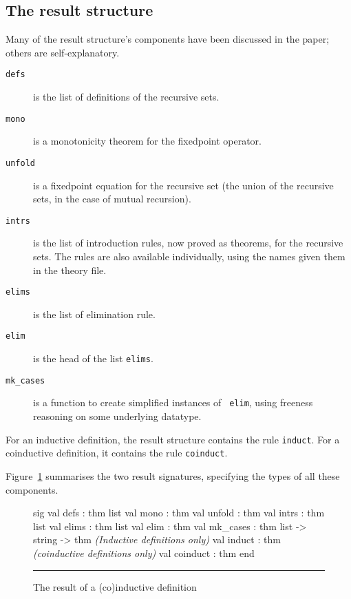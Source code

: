 \subsection{The result structure}
Many of the result structure's components have been discussed in the paper;
others are self-explanatory.
\begin{description}
\item[\tt defs] is the list of definitions of the recursive sets.

\item[\tt mono] is a monotonicity theorem for the fixedpoint operator.

\item[\tt unfold] is a fixedpoint equation for the recursive set (the union of
the recursive sets, in the case of mutual recursion).

\item[\tt intrs] is the list of introduction rules, now proved as theorems, for
the recursive sets.  The rules are also available individually, using the
names given them in the theory file. 

\item[\tt elims] is the list of elimination rule.

\item[\tt elim] is the head of the list {\tt elims}.
  
\item[\tt mk_cases] is a function to create simplified instances of {\tt
elim}, using freeness reasoning on some underlying datatype.
\end{description}

For an inductive definition, the result structure contains the
rule \texttt{induct}.  For a
coinductive definition, it contains the rule \verb|coinduct|.

Figure~\ref{def-result-fig} summarises the two result signatures,
specifying the types of all these components.

\begin{figure}
\begin{ttbox}
sig
val defs         : thm list
val mono         : thm
val unfold       : thm
val intrs        : thm list
val elims        : thm list
val elim         : thm
val mk_cases     : thm list -> string -> thm
{\it(Inductive definitions only)} 
val induct       : thm
{\it(coinductive definitions only)}
val coinduct     : thm
end
\end{ttbox}
\hrule
\caption{The {\ML} result of a (co)inductive definition} \label{def-result-fig}
\end{figure}

